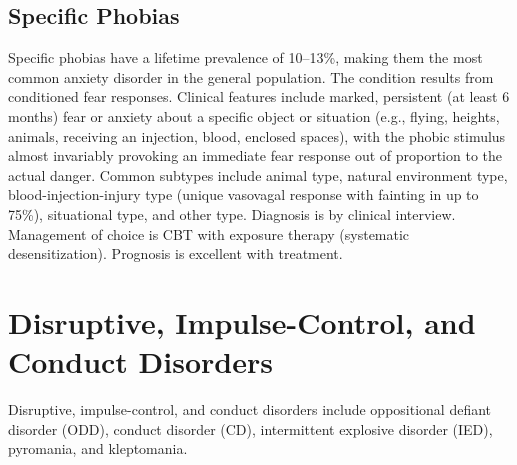 \subsection{Specific Phobias}
\label{sec:Specific Phobias}
Specific phobias have a lifetime prevalence of 10--13\%, making them the most common anxiety disorder in the general population. The condition results from conditioned fear responses. Clinical features include marked, persistent (at least 6 months) fear or anxiety about a specific object or situation (e.g., flying, heights, animals, receiving an injection, blood, enclosed spaces), with the phobic stimulus almost invariably provoking an immediate fear response out of proportion to the actual danger. Common subtypes include animal type, natural environment type, blood-injection-injury type (unique vasovagal response with fainting in up to 75\%), situational type, and other type. Diagnosis is by clinical interview. Management of choice is CBT with exposure therapy (systematic desensitization). Prognosis is excellent with treatment.

\section{Disruptive, Impulse-Control, and Conduct Disorders}








\label{sec:Disruptive, Impulse-Control, and Conduct Disorders}

Disruptive, impulse-control, and conduct disorders include oppositional defiant disorder (ODD), conduct disorder (CD), intermittent explosive disorder (IED), pyromania, and kleptomania.

